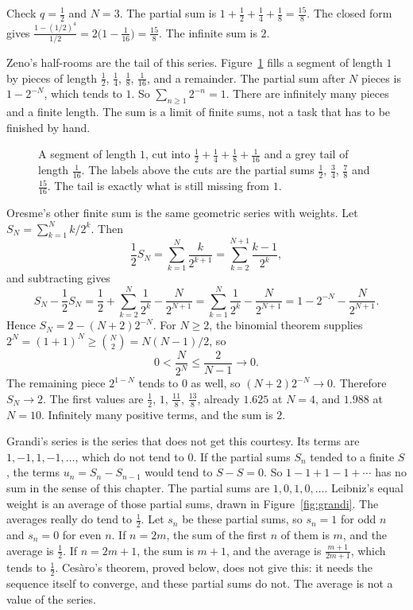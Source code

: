 Check $q=\frac12$ and $N=3$. The partial sum is $1+\frac12+\frac14+\frac18=\frac{15}8$. The closed form gives $\frac{1-(1/2)^4}{1/2}=2\bigl(1-\frac1{16}\bigr)=\frac{15}8$. The infinite sum is $2$.

Zeno's half-rooms are the tail of this series. Figure~\ref{fig:zeno} fills a segment of length $1$ by pieces of length $\frac12$, $\frac14$, $\frac18$, $\frac1{16}$, and a remainder. The partial sum after $N$ pieces is $1-2^{-N}$, which tends to $1$. So $\sum_{n\ge1}2^{-n}=1$. There are infinitely many pieces and a finite length. The sum is a limit of finite sums, not a task that has to be finished by hand.

\begin{figure}[ht]
\centering
{}
\caption{A segment of length $1$, cut into $\frac12+\frac14+\frac18+\frac1{16}$ and a grey tail of length $\frac1{16}$. The labels above the cuts are the partial sums $\frac12$, $\frac34$, $\frac78$ and $\frac{15}{16}$. The tail is exactly what is still missing from $1$.}
\label{fig:zeno}
\end{figure}

Oresme's other finite sum is the same geometric series with weights. Let $S_N=\sum_{k=1}^N k/2^k$. Then
\[
\frac12 S_N=\sum_{k=1}^N\frac{k}{2^{k+1}}=\sum_{k=2}^{N+1}\frac{k-1}{2^k},
\]
and subtracting gives
\[
S_N-\frac12 S_N=\frac12+\sum_{k=2}^N\frac1{2^k}-\frac{N}{2^{N+1}}=\sum_{k=1}^N\frac1{2^k}-\frac{N}{2^{N+1}}=1-2^{-N}-\frac{N}{2^{N+1}}.
\]
Hence $S_N=2-(N+2)2^{-N}$. For $N\ge2$, the binomial theorem supplies $2^N=(1+1)^N\ge\binom N2=N(N-1)/2$, so
\[
0<\frac{N}{2^N}\le\frac{2}{N-1}\to0.
\]
The remaining piece $2^{1-N}$ tends to $0$ as well, so $(N+2)2^{-N}\to0$. Therefore $S_N\to2$. The first values are $\frac12$, $1$, $\frac{11}8$, $\frac{13}8$, already $1.625$ at $N=4$, and $1.988$ at $N=10$. Infinitely many positive terms, and the sum is $2$.

Grandi's series is the series that does not get this courtesy. Its terms are $1,-1,1,-1,\ldots$, which do not tend to $0$. If the partial sums $S_n$ tended to a finite $S$, the terms $u_n=S_n-S_{n-1}$ would tend to $S-S=0$. So $1-1+1-1+\cdots$ has no sum in the sense of this chapter. The partial sums are $1,0,1,0,\ldots$. Leibniz's equal weight is an average of those partial sums, drawn in Figure~\ref{fig:grandi}. The averages really do tend to $\frac12$. Let $s_n$ be these partial sums, so $s_n=1$ for odd $n$ and $s_n=0$ for even $n$. If $n=2m$, the sum of the first $n$ of them is $m$, and the average is $\frac12$. If $n=2m+1$, the sum is $m+1$, and the average is $\frac{m+1}{2m+1}$, which tends to $\frac12$. Ces\`aro's theorem, proved below, does not give this: it needs the sequence itself to converge, and these partial sums do not. The average is not a value of the series.


